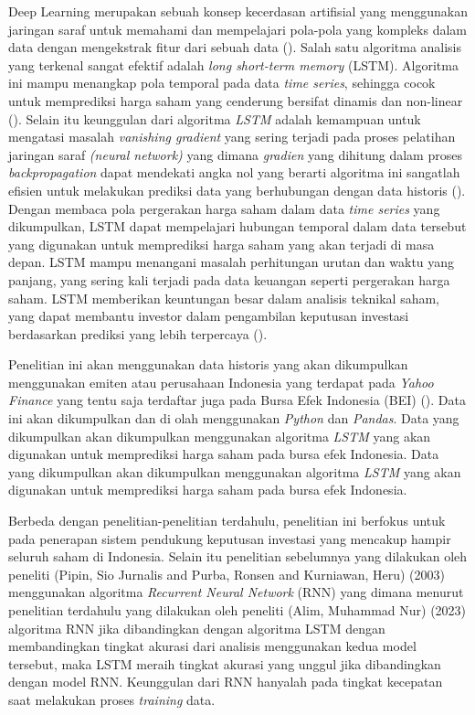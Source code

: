 Deep Learning merupakan sebuah konsep kecerdasan artifisial yang menggunakan jaringan saraf untuk memahami dan mempelajari pola-pola yang kompleks dalam data dengan mengekstrak fitur dari sebuah data (\cite{pipin2023prediksi}). Salah satu algoritma analisis yang terkenal sangat efektif adalah \textit{long short-term memory} (LSTM). Algoritma ini mampu menangkap pola temporal pada data \textit{time series}, sehingga cocok untuk memprediksi harga saham yang cenderung bersifat dinamis dan non-linear (\cite{chairurrachman2022penerapan}). Selain itu keunggulan dari algoritma \textit{LSTM} adalah kemampuan untuk mengatasi masalah \textit{vanishing gradient} yang sering terjadi pada proses pelatihan jaringan saraf \textit{(neural network)} yang dimana \textit{gradien} yang dihitung dalam proses \textit{backpropagation} dapat mendekati angka nol yang berarti algoritma ini sangatlah efisien untuk melakukan prediksi data yang berhubungan dengan data historis (\cite{alim2023pemodelan}). Dengan membaca pola pergerakan harga saham dalam data \textit{time series} yang dikumpulkan, LSTM dapat mempelajari hubungan temporal dalam data tersebut yang digunakan untuk memprediksi harga saham yang akan terjadi di masa depan. LSTM mampu menangani masalah perhitungan urutan dan waktu yang panjang, yang sering kali terjadi pada data keuangan seperti pergerakan harga saham. LSTM memberikan keuntungan besar dalam analisis teknikal saham, yang dapat membantu investor dalam pengambilan keputusan investasi berdasarkan prediksi yang lebih terpercaya (\cite{sofi2021perbandingan}).

Penelitian ini akan menggunakan data historis yang akan dikumpulkan menggunakan emiten atau perusahaan Indonesia yang terdapat pada \textit{Yahoo Finance} yang tentu saja terdaftar juga pada Bursa Efek Indonesia (BEI) (\cite{julian2021peramalan}). Data ini akan dikumpulkan dan di olah menggunakan \textit{Python} dan \textit{Pandas}. Data yang dikumpulkan akan dikumpulkan menggunakan algoritma \textit{LSTM} yang akan digunakan untuk memprediksi harga saham pada bursa efek Indonesia. Data yang dikumpulkan akan dikumpulkan menggunakan algoritma \textit{LSTM} yang akan digunakan untuk memprediksi harga saham pada bursa efek Indonesia.

Berbeda dengan penelitian-penelitian terdahulu, penelitian ini berfokus untuk pada penerapan sistem pendukung keputusan investasi yang mencakup hampir seluruh saham di Indonesia. Selain itu penelitian sebelumnya yang dilakukan oleh peneliti (Pipin, Sio Jurnalis and Purba, Ronsen and Kurniawan, Heru) (2003) menggunakan algoritma \textit{Recurrent Neural Network} (RNN) yang dimana menurut penelitian terdahulu yang dilakukan oleh peneliti (Alim, Muhammad Nur) (2023) algoritma RNN jika dibandingkan dengan algoritma LSTM dengan membandingkan tingkat akurasi dari analisis menggunakan kedua model tersebut, maka LSTM meraih tingkat akurasi yang unggul jika dibandingkan dengan model RNN. Keunggulan dari RNN hanyalah pada tingkat kecepatan saat melakukan proses \textit{training} data.

